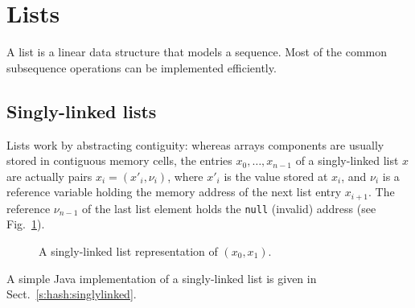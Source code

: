 \documentclass[a4paper]{book}
\theoremstyle{changebreak}                %
\begin{document}
\section{Lists}
\label{s:linear:list}
A list is a linear data
structure that models a sequence. Most of the common
subsequence operations can be implemented
efficiently. 

\subsection{Singly-linked lists}
\label{s:linear:singlylinked}
Lists work by abstracting contiguity: whereas arrays
components are usually stored in contiguous
memory cells, the entries $x_0,\ldots,x_{n-1}$ of a
singly-linked list $x$ are actually pairs
$x_i=(x'_i,\nu_i)$, where $x'_i$ is the value stored at $x_i$, and
$\nu_i$ is a reference variable holding the memory
address of the next list entry
$x_{i+1}$. The reference $\nu_{n-1}$ of the last list element holds the
{\tt null} (invalid) address (see
Fig.~\ref{f:singlylinked}).
\begin{figure}[!ht]
\begin{center}
\end{center}
\caption{A singly-linked list representation of $(x_0,x_1)$.}
\label{f:singlylinked}
\end{figure}

A simple Java implementation of a singly-linked list is given in
Sect.~\ref{s:hash:singlylinked}.
\end{document}
